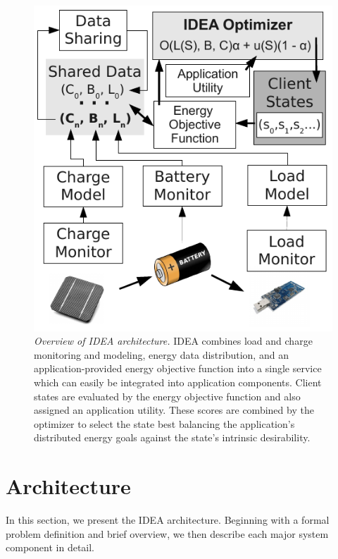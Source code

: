 \documentclass{sig-alternate}
\begin{document}
\begin{figure}[t]
\begin{center}
\includegraphics[width=\hsize]{./figs/IDEAArchitecture.pdf}
\end{center}

\caption{\textit{Overview of IDEA architecture.} IDEA combines load and
charge monitoring and modeling, energy data distribution, and an
application-provided energy objective function into a single service which
can easily be integrated into application components. Client states are
evaluated by the energy objective function and also assigned an application
utility. These scores are combined by the optimizer to select the state best
balancing the application's distributed energy goals against the state's
intrinsic desirability.}

\label{fig-arch}
\end{figure}

\vfill\eject
\section{Architecture}
\label{sec-architecture}

In this section, we present the IDEA architecture. Beginning with a formal
problem definition and brief overview, we then describe each major system
component in detail.
\end{document}
